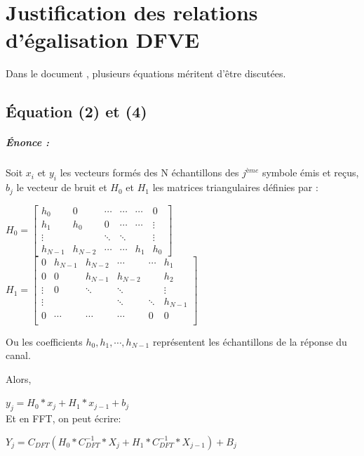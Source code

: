 
\chapter{Justification des relations d'égalisation DFVE}

Dans le document \cite{sujet}, plusieurs équations méritent d'être discutées.

\section{Équation (2) et (4)}
\label{sec:24}

\paragraph{Énonce :}

Soit $x_i$ et $y_i$ les vecteurs formés des N échantillons des $j^{ème}$
symbole émis et reçus, $b_j$ le vecteur de bruit et $H_0$ et $H_1$ les matrices
triangulaires définies par :

$H_0=
\begin{bmatrix}
  h_0 & 0 & \cdots & \cdots & \cdots & 0 \\
  h_1 & h_0 & 0 & \cdots  & \cdots & \vdots \\
  \vdots & & \ddots & \ddots &  & \vdots \\
  h_{N-1} & h_{N-2} & \cdots & \cdots & h_1 & h_0

\end{bmatrix}
$  $H_1=
\begin{bmatrix}
  0 & h_{N-1} & h_{N-2} & \cdots & \cdots & h_1 \\
  0 & 0 & h_{N-1} & h_{N-2} &  & h_2 \\
  \vdots & 0 & \ddots & \ddots &   & \vdots \\
  \vdots &  &  & \ddots  & \ddots & h_{N-1} \\
  0 & \cdots & \cdots & \cdots & 0 & 0 \\


\end{bmatrix}
$

Ou les coefficients $h_0,h_1,\cdots,h_{N-1}$ représentent les échantillons de la
réponse du canal.

Alors,

$ y_j = H_0*x_j+H_1*x_{j-1}+b_j$
~\\

Et en FFT, on peut écrire:

$ Y_j = C_{DFT}(H_0*C_{DFT}^{-1}*X_j + H_1*C_{DFT}^{-1}*X_{j-1}) + B_j$

